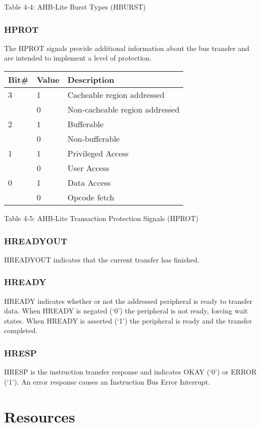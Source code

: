 \protect\hypertarget{_Toc326677774}{}{}Table 4‑4: AHB-Lite Burst Types
(HBURST)

\subsubsection{HPROT}\label{hprot}

The HPROT signals provide additional information about the bus transfer
and are intended to implement a level of protection.

\begin{longtable}[]{@{}lll@{}}
\toprule
Bit\# & Value & Description\tabularnewline
\midrule
\endhead
3 & 1 & Cacheable region addressed\tabularnewline
& 0 & Non-cacheable region addressed\tabularnewline
2 & 1 & Bufferable\tabularnewline
& 0 & Non-bufferable\tabularnewline
1 & 1 & Privileged Access\tabularnewline
& 0 & User Access\tabularnewline
0 & 1 & Data Access\tabularnewline
& 0 & Opcode fetch\tabularnewline
\bottomrule
\end{longtable}

\protect\hypertarget{_Toc326677775}{}{}Table 4‑5: AHB-Lite Transaction
Protection Signals (HPROT)

\subsubsection{HREADYOUT}\label{hreadyout}

HREADYOUT indicates that the current transfer has finished.

\subsubsection{HREADY}\label{hready}

HREADY indicates whether or not the addressed peripheral is ready to
transfer data. When HREADY is negated (`0') the peripheral is not ready,
forcing wait states. When HREADY is asserted (`1') the peripheral is
ready and the transfer completed.

\subsubsection{HRESP}\label{hresp}

HRESP is the instruction transfer response and indicates OKAY (`0') or
ERROR (`1'). An error response causes an Instruction Bus Error
Interrupt.

\section{Resources}\label{resources}

